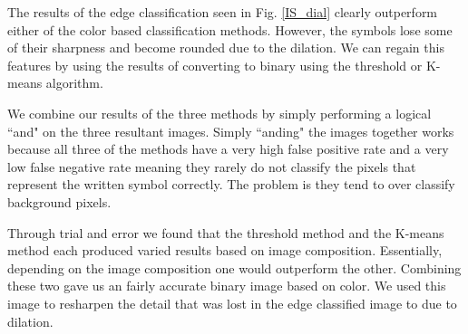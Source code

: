 
The results of the edge classification seen in Fig. \ref{IS_dial} clearly outperform either of the color based classification methods. However, the symbols lose some of their sharpness and become rounded due to the dilation. We can regain this features by using the results of converting to binary using the threshold or K-means algorithm.

We combine our results of the three methods by simply performing a logical ``and" on the three resultant images. Simply ``anding" the images together works because all three of the methods have a very high false positive rate and a very low false negative rate meaning they rarely do not classify the pixels that represent the written symbol correctly. The problem is they tend to over classify background pixels.


Through trial and error we found that the threshold method and the K-means method each produced varied results based on image composition. Essentially, depending on the image composition one would outperform the other. Combining these two gave us an fairly accurate binary image based on color. We used this image to resharpen the detail that was lost in the edge classified image to due to dilation.

